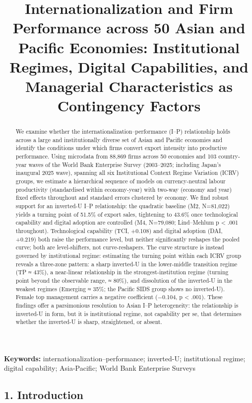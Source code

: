 \documentclass[
  12pt,a4paper]{article}
\title{Internationalization and Firm Performance across 50 Asian and
Pacific Economies: Institutional Regimes, Digital Capabilities, and
Managerial Characteristics as Contingency Factors}
\author{}
\date{}
\begin{document}
\maketitle
\begin{abstract}
We examine whether the internationalization--performance (I--P)
relationship holds across a large and institutionally diverse set of
Asian and Pacific economies and identify the conditions under which
firms convert export intensity into productive performance. Using
microdata from 88,869 firms across 50 economies and 103 country-year
waves of the World Bank Enterprise Survey (2003--2025; including Japan's
inaugural 2025 wave), spanning all six Institutional Context Regime
Variation (ICRV) groups, we estimate a hierarchical sequence of models
on currency-neutral labour productivity (standardised within
economy-year) with two-way (economy and year) fixed effects throughout
and standard errors clustered by economy. We find robust support for an
inverted-U I--P relationship: the quadratic baseline (M2, N=81,022)
yields a turning point of 51.5\% of export sales, tightening to 43.6\%
once technological capability and digital adoption are controlled (M4,
N=79,080; Lind--Mehlum p \textless{} .001 throughout). Technological
capability (TCI, +0.108) and digital adoption (DAI, +0.219) both raise
the performance level, but neither significantly reshapes the pooled
curve; both are level-shifters, not curve-reshapers. The curve structure
is instead governed by institutional regime: estimating the turning
point within each ICRV group reveals a three-zone pattern: a sharp
inverted-U in the lower-middle transition regime (TP ≈ 43\%), a
near-linear relationship in the strongest-institution regime (turning
point beyond the observable range, ≈ 80\%), and dissolution of the
inverted-U in the weakest regimes (Emerging ≈ 35\%; the Pacific SIDS
group shows no inverted-U). Female top management carries a negative
coefficient (−0.104, p \textless{} .001). These findings offer a
parsimonious resolution to Asian I--P heterogeneity: the relationship is
inverted-U in form, but it is institutional regime, not capability per
se, that determines whether the inverted-U is sharp, straightened, or
absent.
\end{abstract}

\textbf{Keywords:} internationalization--performance; inverted-U;
institutional regime; digital capability; Asia-Pacific; World Bank
Enterprise Surveys

\hypertarget{introduction}{%
\subsection{1. Introduction}\label{introduction}}
\end{document}

